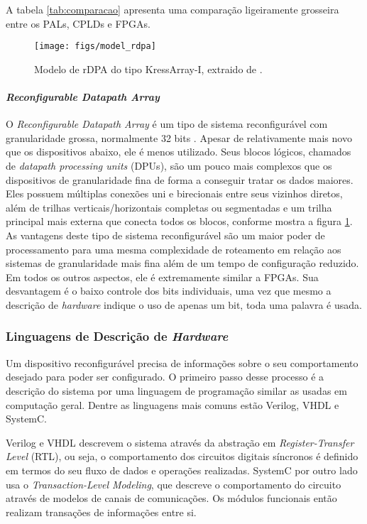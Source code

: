 \documentclass[11pt,a4paper,oneside]{book}
\begin{document}
A tabela \ref{tab:comparacao} apresenta uma compara\c{c}\~ao ligeiramente grosseira entre os PALs, CPLDs e FPGAs.

\begin{figure}[h]
\centering
\texttt{[image: figs/model\_rdpa]}
\caption{Modelo de rDPA do tipo KressArray-I, extraido de \cite{Hartenstein1995}.}
\label{fig:kressarray}
\end{figure}

\paragraph{\textit{Reconfigurable Datapath Array}}
O \textit{Reconfigurable Datapath Array} \'e um tipo de sistema reconfigur\'avel com granularidade grossa, normalmente 32 bits \cite{Hartenstein2001}.
Apesar de relativamente mais novo que os dispositivos abaixo, ele \'e menos utilizado.
Seus blocos l\'ogicos, chamados de \textit{datapath processing units} (DPUs), s\~ao um pouco mais complexos que os dispositivos de granularidade fina de forma a conseguir tratar os dados maiores.
Eles possuem m\'ultiplas conex\~oes uni e birecionais entre seus vizinhos diretos, al\'em de trilhas verticais/horizontais completas ou segmentadas e um trilha principal mais externa que conecta todos os blocos, conforme mostra a figura \ref{fig:kressarray}.
As vantagens deste tipo de sistema reconfigur\'avel s\~ao um maior poder de processamento para uma mesma complexidade de roteamento em rela\c{c}\~ao aos sistemas de granularidade mais fina al\'em de um tempo de configura\c{c}\~ao reduzido.
Em todos os outros aspectos, ele \'e extremamente similar a FPGAs.
Sua desvantagem \'e o baixo controle dos bits individuais, uma vez que mesmo a descri\c{c}\~ao de \textit{hardware} indique o uso de apenas um bit, toda uma palavra \'e usada.

\subsubsection{Linguagens de Descri\c{c}\~ao de \textit{Hardware}}
Um dispositivo reconfigur\'avel precisa de informa\c{c}\~oes sobre o seu comportamento desejado para poder ser configurado.
O primeiro passo desse processo \'e a descri\c{c}\~ao do sistema por uma linguagem de programa\c{c}\~ao similar as usadas em computa\c{c}\~ao geral.
Dentre as linguagens mais comuns est\~ao Verilog, VHDL e SystemC.

Verilog e VHDL descrevem o sistema atrav\'es da abstra\c{c}\~ao em \textit{Register-Transfer Level} (RTL), ou seja, o comportamento dos circuitos digitais s\'i­ncronos \'e definido em termos do seu fluxo de dados e opera\c{c}\~oes realizadas.
SystemC por outro lado usa o \textit{Transaction-Level Modeling}, que descreve o comportamento do circuito atrav\'es de modelos de canais de comunica\c{c}\~oes.
Os m\'odulos funcionais ent\~ao realizam transa\c{c}\~oes de informa\c{c}\~oes entre si.
\end{document}
